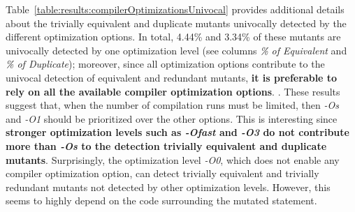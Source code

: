Table~\ref{table:results:compilerOptimizationsUnivocal} provides additional details about the trivially equivalent and duplicate mutants univocally detected by the different optimization options. In total, 4.44\% and 3.34\% of these mutants are univocally detected  by one optimization level (see columns \emph{\% of Equivalent} and \emph{\% of Duplicate}); moreover, since all optimization options contribute to the univocal detection of equivalent and redundant mutants, \textbf{it is preferable to rely on all the available compiler optimization options}.
. These results suggest that, when the number of compilation runs must be limited, then \emph{-Os} and \emph{-O1} should be prioritized over the other options. This is interesting since \textbf{stronger optimization levels such as \emph{-Ofast} and \emph{-O3} do not contribute more than \emph{-Os} to the detection trivially equivalent and duplicate mutants}. Surprisingly, the optimization level \emph{-O0}, which does not enable any compiler optimization option, can detect trivially equivalent and trivially redundant mutants not detected by other optimization levels. However, this seems to highly depend on the code surrounding the mutated statement.


